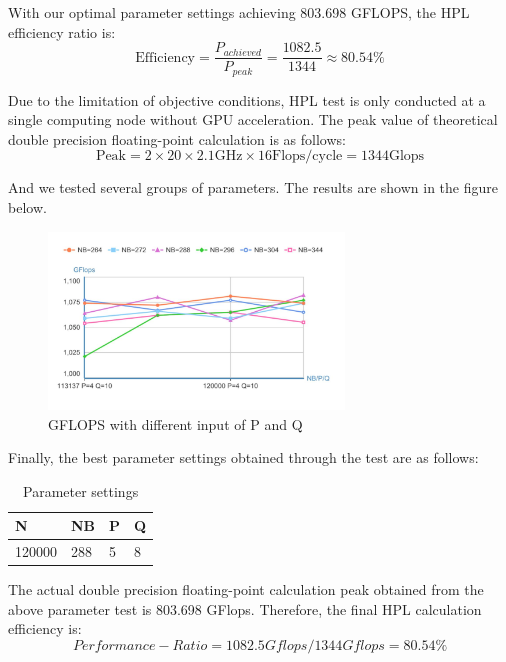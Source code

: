 \documentclass[a4paper,12pt]{article}
\begin{document}
With our optimal parameter settings achieving 803.698 GFLOPS, the HPL efficiency ratio is:
\begin{equation}
    \text{Efficiency} = \frac{P_{achieved}}{P_{peak}} = \frac{1082.5}{1344} \approx 80.54\%
\end{equation}

Due to the limitation of objective conditions, HPL test is only conducted at a single computing node without GPU acceleration. The peak value of theoretical double precision floating-point calculation is as follows:
\begin{equation*}
\text{Peak} = 2 \times 20 \times 2.1\text{GHz} \times 16\text{Flops/cycle} = 1344\text{Glops}
\end{equation*}

And we tested several groups of parameters. The results are shown in the figure below.

\begin{figure}[H]
    \centering
    \includegraphics[width=0.7\textwidth]{images/performance/GFLOPS_PQ_NB.png}
    \caption{GFLOPS with different input of P and Q}
    \label{fig:gflops_pq_nb}
\end{figure}

Finally, the best parameter settings obtained through the test are as follows:
\begin{table}[H]
\centering
\caption{Parameter settings}
\vspace{0.5cm}
\begin{tabular}{llll}
\toprule
N & NB & P & Q \\
\midrule
120000 & 288 & 5 & 8 \\
\bottomrule
\end{tabular}
\end{table}

The actual double precision floating-point calculation peak obtained from the above parameter test is 803.698 GFlops. Therefore, the final HPL calculation efficiency is:
\begin{equation*}
Performance-Ratio = 1082.5Gflops/1344Gflops = 80.54\%
\end{equation*}
\end{document}
